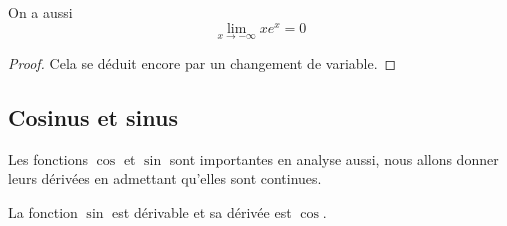 \begin{cor}
    On a aussi $$\lim_{x\to-\infty}xe^x = 0$$
\end{cor}

\begin{proof}
    Cela se déduit encore par un changement de variable.
\end{proof}

\subsection{Cosinus et sinus}

Les fonctions $\cos$ et $\sin$ sont importantes en analyse aussi, nous allons donner leurs dérivées en admettant qu'elles sont continues.

\begin{prop}
    La fonction $\sin$ est dérivable et sa dérivée est $\cos$.
\end{prop}


